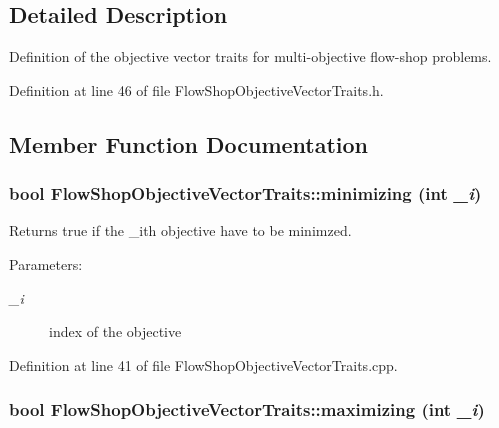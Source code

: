 \subsection{Detailed Description}
Definition of the objective vector traits for multi-objective flow-shop problems. 



Definition at line 46 of file Flow\-Shop\-Objective\-Vector\-Traits.h.

\subsection{Member Function Documentation}
\subsubsection{\setlength{\rightskip}{0pt plus 5cm}bool Flow\-Shop\-Objective\-Vector\-Traits::minimizing (int {\em \_\-i})\hspace{0.3cm}{\tt  [static]}}\label{classFlowShopObjectiveVectorTraits_e1a0f5be1782b9f9ce08128a404a1fa8}


Returns true if the \_\-ith objective have to be minimzed. 

\begin{Desc}
\item[Parameters:]
\begin{description}
\item[{\em \_\-i}]index of the objective \end{description}
\end{Desc}


Definition at line 41 of file Flow\-Shop\-Objective\-Vector\-Traits.cpp.
\subsubsection{\setlength{\rightskip}{0pt plus 5cm}bool Flow\-Shop\-Objective\-Vector\-Traits::maximizing (int {\em \_\-i})\hspace{0.3cm}{\tt  [static]}}\label{classFlowShopObjectiveVectorTraits_229fbb4cc19d289637891c1b49f3eaba}


